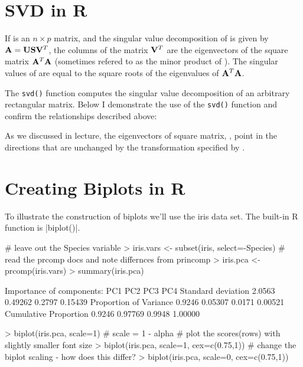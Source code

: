 
\section{SVD in R}

If  is an $n \times p$ matrix, and the singular value decomposition of  is given by $\mathbf{A} = \mathbf{U} \mathbf{S} \mathbf{V}^T$, the columns of the  matrix $\mathbf{V}^T$ are the eigenvectors of the square matrix $\mathbf{A}^T \mathbf{A}$ (sometimes refered to  as the minor product of ). The singular values of  are equal to the square roots of the eigenvalues of $\mathbf{A}^T \mathbf{A}$. 

The \verb|svd()| function computes the singular value decomposition of an arbitrary rectangular matrix. Below I demonstrate the use of the \verb|svd()| function and confirm the relationships described above:


As we discussed in lecture, the eigenvectors of square matrix, , point in the directions that are unchanged by the transformation specified by .



\section{Creating Biplots in R}

To illustrate the construction of biplots we'll use the iris data set. The built-in R function is |biplot()|. 

\begin{R}
# leave out the Species variable
> iris.vars <- subset(iris, select=-Species) 
# read the prcomp docs and note differnces from princomp
> iris.pca <- prcomp(iris.vars)
> summary(iris.pca)

Importance of components:
                          PC1     PC2    PC3     PC4
Standard deviation     2.0563 0.49262 0.2797 0.15439
Proportion of Variance 0.9246 0.05307 0.0171 0.00521
Cumulative Proportion  0.9246 0.97769 0.9948 1.00000

> biplot(iris.pca, scale=1)  # scale = 1 - alpha
# plot the scores(rows) with slightly smaller font size
> biplot(iris.pca, scale=1, cex=c(0.75,1)) 
# change the biplot scaling - how does this differ?
> biplot(iris.pca, scale=0, cex=c(0.75,1))  
\end{R}

